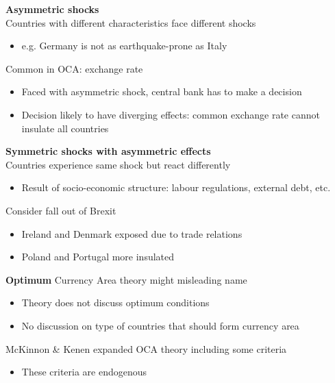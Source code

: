 \documentclass{beamer}
\begin{document}
\begin{frame}
  \textbf{Asymmetric shocks}\\
  \medskip
  Countries with different characteristics face different shocks  
  \begin{itemize}
    \item e.g. Germany is not as earthquake-prone as Italy
  \end{itemize}
  \medskip
   Common in OCA: exchange rate  
  \begin{itemize}
    \item Faced with asymmetric shock, central bank has to make a decision
    \item Decision likely to have diverging effects: common exchange rate cannot insulate all countries
  \end{itemize}
\end{frame}

\begin{frame}
  \textbf{Symmetric shocks with asymmetric effects}\\
  \medskip
  Countries experience same shock but react differently
  \begin{itemize}
    \item Result of socio-economic structure: labour regulations, external debt, etc.
  \end{itemize}
  \medskip
  Consider fall out of Brexit
  \begin{itemize}
    \item Ireland and Denmark exposed due to trade relations
    \item Poland and Portugal more insulated
  \end{itemize}
\end{frame}

\begin{frame}
  \textbf{Optimum} Currency Area theory might misleading name
  \begin{itemize}
    \item Theory does not discuss optimum conditions
    \item No discussion on type of countries that should form currency area
  \end{itemize}
  \medskip
  McKinnon \& Kenen expanded OCA theory including some criteria
  \begin{itemize}
    \item These criteria are endogenous
  \end{itemize}
\end{frame}
\end{document}
